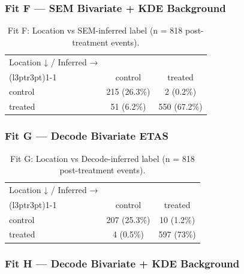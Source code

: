 \documentclass[
]{article}
\begin{document}
\subsubsection{Fit F --- SEM Bivariate + KDE
Background}\label{fit-f-sem-bivariate-kde-background}

\begin{longtable}[t]{lcc}

\caption{\label{tbl-cm-F}Fit F: Location vs SEM-inferred label (n = 818
post-treatment events).}

\tabularnewline

\\
\toprule
\multicolumn{1}{c}{Location ↓ / Inferred →} & \multicolumn{2}{c}{ } \\
\cmidrule(l{3pt}r{3pt}){1-1}
 & control & treated\\
\midrule
control & 215  (26.3\%) & 2  (0.2\%)\\
treated & 51  (6.2\%) & 550  (67.2\%)\\
\bottomrule

\end{longtable}

\subsubsection{Fit G --- Decode Bivariate
ETAS}\label{fit-g-decode-bivariate-etas}

\begin{longtable}[t]{lcc}

\caption{\label{tbl-cm-G}Fit G: Location vs Decode-inferred label (n =
818 post-treatment events).}

\tabularnewline

\\
\toprule
\multicolumn{1}{c}{Location ↓ / Inferred →} & \multicolumn{2}{c}{ } \\
\cmidrule(l{3pt}r{3pt}){1-1}
 & control & treated\\
\midrule
control & 207  (25.3\%) & 10  (1.2\%)\\
treated & 4  (0.5\%) & 597  (73\%)\\
\bottomrule

\end{longtable}

\subsubsection{Fit H --- Decode Bivariate + KDE
Background}\label{fit-h-decode-bivariate-kde-background}
\end{document}
